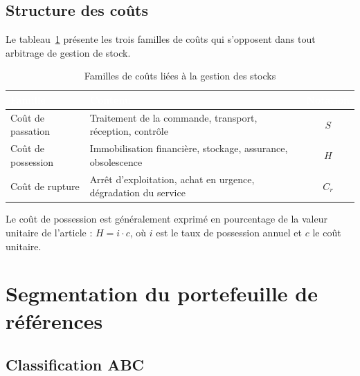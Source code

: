 \subsection{Structure des coûts}

Le tableau~\ref{tab:couts_stock} présente les trois familles de coûts qui
s'opposent dans tout arbitrage de gestion de stock.

\begin{table}[H]
  \centering
  \caption{Familles de coûts liées à la gestion des stocks}
  \label{tab:couts_stock}
  \renewcommand{\arraystretch}{1.4}
  \begin{tabularx}{\textwidth}{|l|X|c|}
    \hline
    \rowcolor{iacsTableHead}
    \textcolor{white}{\textbf{Famille}} &
    \textcolor{white}{\textbf{Contenu}} &
    \textcolor{white}{\textbf{Notation}} \\
    \hline
    Coût de passation &
    Traitement de la commande, transport, réception, contrôle &
    $S$ \\
    \hline
    \rowcolor{iacsLightGray}
    Coût de possession &
    Immobilisation financière, stockage, assurance, obsolescence &
    $H$ \\
    \hline
    Coût de rupture &
    Arrêt d'exploitation, achat en urgence, dégradation du service &
    $C_{r}$ \\
    \hline
  \end{tabularx}
\end{table}

Le coût de possession est généralement exprimé en pourcentage de la valeur
unitaire de l'article : $H = i \cdot c$, où $i$ est le taux de possession annuel
et $c$ le coût unitaire.


\section{Segmentation du portefeuille de références}
\label{sec:segmentation}

\subsection{Classification ABC}

